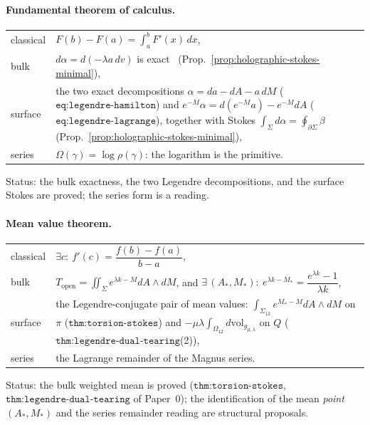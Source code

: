 \paragraph{Fundamental theorem of calculus.} \hfill
\begin{center}
\begin{tabular}{lp{}}
classical & $F(b)-F(a)=\int_a^b F'(x)\,dx$,\\[2pt]
bulk & $d\alpha=d(-\lambda a\,dv)$ is exact
  \ (Prop.~\ref{prop:holographic-stokes-minimal}),\\[2pt]
surface & the two exact decompositions $\alpha=da-dA-a\,dM$
  ($\texttt{eq:legendre-hamilton}$) and
  $e^{-M}\alpha=d(e^{-M}a)-e^{-M}dA$ ($\texttt{eq:legendre-lagrange}$), together
  with Stokes $\int_\Sigma d\alpha=\oint_{\partial\Sigma}\beta$
  (Prop.~\ref{prop:holographic-stokes-minimal}),\\[2pt]
series & $\Omega(\gamma)=\log\rho(\gamma)$: the logarithm is the primitive.
\end{tabular}
\end{center}
{\small Status: the bulk exactness, the two Legendre decompositions, and the
surface Stokes are proved; the series form is a reading.}

\paragraph{Mean value theorem.} \hfill
\begin{center}
\begin{tabular}{lp{}}
classical & $\exists c:\ f'(c)=\dfrac{f(b)-f(a)}{b-a}$,\\[2pt]
bulk & $T_{\mathrm{open}}=\iint_\Sigma e^{\lambda k-M}dA\wedge dM$,
  and $\exists\,(A_*,M_*):\ e^{\lambda k-M_*}=\dfrac{e^{\lambda k}-1}{\lambda k}$,\\[2pt]
surface & the Legendre-conjugate pair of mean values:
  $\int_{\Sigma_{12}}e^{M_*-M}dA\wedge dM$ on $\pi$
  ($\texttt{thm:torsion-stokes}$) and
  $-\mu\lambda\int_{\Omega_{12}}d\mathrm{vol}_{g_{\mu,\lambda}}$ on $Q$
  ($\texttt{thm:legendre-dual-tearing}$(2)),\\[2pt]
series & the Lagrange remainder of the Magnus series.
\end{tabular}
\end{center}
{\small Status: the bulk weighted mean is proved
($\texttt{thm:torsion-stokes}$, $\texttt{thm:legendre-dual-tearing}$ of Paper~0);
the identification of the mean \emph{point} $(A_*,M_*)$ and the series remainder
reading are structural proposals.}

